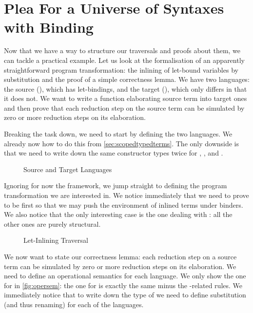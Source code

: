 \chapter{Plea For a Universe of Syntaxes with Binding}

Now that we have a way to structure our traversals and proofs about them, we can
tackle a practical example. Let us look at the formalisation of an apparently
straightforward program transformation: the inlining of let-bound variables by
substitution and the proof of a simple correctness lemma. We have two languages:
the source (), which has let-bindings, and the target (), which only
differs in that it does not. We want to write a function elaborating source term
into target ones and then prove that each reduction step on the source term can
be simulated by zero or more reduction steps on its elaboration.

Breaking the task down, we need to start by defining the two languages. We already
now how to do this from \cref{sec:scopedtypedterms}. The only downside is that we
need to write down the same constructor types twice for , ,
and .

\begin{figure}[h]
\caption{Source and Target Languages}
\end{figure}

Ignoring for now the  framework, we jump straight to defining the
program transformation we are interested in. We notice immediately that we need
to prove  to be  first so that we may push the environment
of inlined terms under binders. We also notice that the only interesting case
is the one dealing with : all the other ones are purely structural.

\begin{figure}[h]
\caption{Let-Inlining Traversal}
\end{figure}

We now want to state our correctness lemma: each reduction step on a source term
can be simulated by zero or more reduction steps on its elaboration. We need to
define an operational semantics for each language. We only show the one for 
in \cref{fig:opersem}: the one for  is exactly the same minus the
-related rules. We immediately notice that to write down the type of
 we need to define substitution (and thus renaming) for each of the languages.

